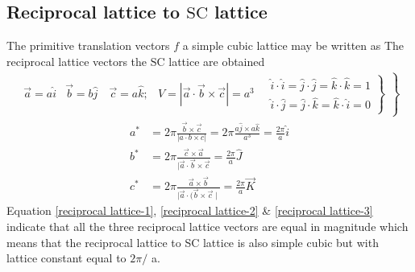 \subsection{Reciprocal lattice to $\mathrm{SC}$ lattice}
The primitive translation vectors $f$ a simple cubic lattice may be written as
The reciprocal lattice vectors the $\mathrm{SC}$ lattice are obtained
\begin{align*}
\left.\begin{array}{lll}
\vec{a}=a \hat{i} & \vec{b}=b \hat{j} \quad \vec{c}=a \hat{k} ; & \left.V=|\vec{a} \cdot \vec{b} \times \vec{c}|=a^{3} \quad \begin{array}{l}
\hat{i} \cdot \hat{i}=\hat{j} \cdot \hat{j}=\hat{k} \cdot \hat{k}=1 \\
\hat{i} \cdot \hat{j}=\hat{j} \cdot \hat{k}=\hat{k} \cdot \hat{i}=0
\end{array}\right\}
\end{array}\right\}
\end{align*}
\begin{align}
a^{*}&=2 \pi \frac{\vec{b} \times \vec{c}}{|a \cdot b \times c|}=2 \pi \frac{a \hat{j} \times a \hat{k}}{a^{3}}=\frac{2 \pi}{a} \hat{i} \label{reciprocal lattice-1}\\
b^{*}&=2 \pi \frac{\vec{c} \times \vec{a}}{|\vec{a} \cdot \vec{b} \times \vec{c}}=\frac{2 \pi}{a} \hat{J}\label{reciprocal lattice-2} \\
c^{*}&=2 \pi \frac{\vec{a} \times \vec{b}}{\mid \vec{a} \cdot(\vec{b} \times \vec{c} \mid}=\frac{2 \pi}{a} \vec{K} \label{reciprocal lattice-3}
\end{align}
Equation \ref{reciprocal lattice-1}, \ref{reciprocal lattice-2} \& \ref{reciprocal lattice-3} indicate that all the three reciprocal lattice vectors are equal in magnitude which means that the reciprocal lattice to SC lattice is also simple cubic but with lattice constant equal to $2 \pi /$ a.


